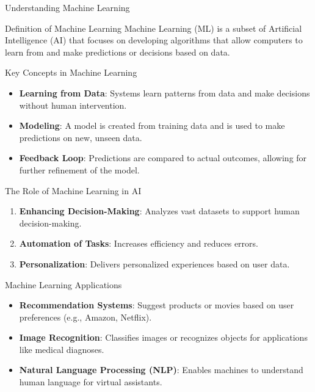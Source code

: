 \documentclass[aspectratio=169]{beamer}
\begin{document}
\begin{frame}{Understanding Machine Learning}
    \begin{block}{Definition of Machine Learning}
        Machine Learning (ML) is a subset of Artificial Intelligence (AI) that focuses on developing algorithms that allow computers to learn from and make predictions or decisions based on data.
    \end{block}
\end{frame}

\begin{frame}{Key Concepts in Machine Learning}
    \begin{itemize}
        \item \textbf{Learning from Data}: Systems learn patterns from data and make decisions without human intervention.
        \item \textbf{Modeling}: A model is created from training data and is used to make predictions on new, unseen data.
        \item \textbf{Feedback Loop}: Predictions are compared to actual outcomes, allowing for further refinement of the model.
    \end{itemize}
\end{frame}

\begin{frame}{The Role of Machine Learning in AI}
    \begin{enumerate}
        \item \textbf{Enhancing Decision-Making}: Analyzes vast datasets to support human decision-making.
        \item \textbf{Automation of Tasks}: Increases efficiency and reduces errors.
        \item \textbf{Personalization}: Delivers personalized experiences based on user data.
    \end{enumerate}
\end{frame}

\begin{frame}{Machine Learning Applications}
    \begin{itemize}
        \item \textbf{Recommendation Systems}: Suggest products or movies based on user preferences (e.g., Amazon, Netflix).
        \item \textbf{Image Recognition}: Classifies images or recognizes objects for applications like medical diagnoses.
        \item \textbf{Natural Language Processing (NLP)}: Enables machines to understand human language for virtual assistants.
    \end{itemize}
\end{frame}
\end{document}
